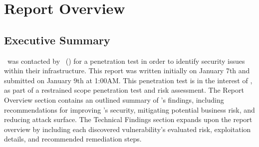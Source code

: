 \section{Report Overview}
\subsection{Executive Summary}
    \teamname\ was contacted by \client\ (\cptc) for a penetration test in order to identify security issues within their infrastructure. This report was written initially on January 7th and submitted on January 9th at 1:00AM. This penetration test is in the interest of \cptc, as part of a restrained scope penetration test and risk assessment. The Report Overview section contains an outlined summary of \teamname's findings, including recommendations for improving \cptc's security, mitigating potential business risk, and reducing attack surface. The Technical Findings section expands upon the report overview by including each discovered vulnerability's evaluated risk, exploitation details, and recommended remediation steps.
    
